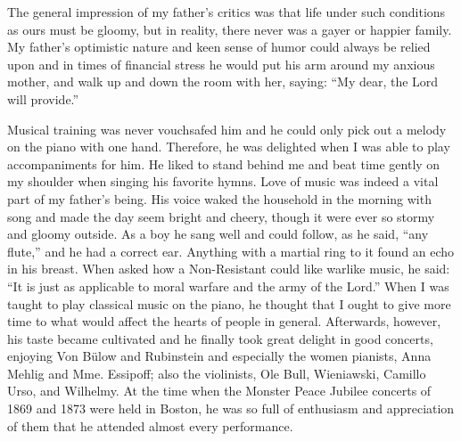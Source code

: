 \documentclass{book}
\begin{document}
The general impression of my father’s critics was that life under such conditions as ours must be gloomy, but in reality, there never was a gayer or happier family. My father’s optimistic nature and keen sense of humor could always be relied upon and in times of financial stress he would put his arm around my anxious mother, and walk up and down the room with her, saying: “My dear, the Lord will provide.”

Musical training was never vouchsafed him and he could only pick out a melody on the piano with one hand. Therefore, he was delighted when I was able to play accompaniments for him. He liked to stand behind me and beat time gently on my shoulder when singing his favorite hymns. Love of music was indeed a vital part of my father’s being. His voice waked the household in the morning with song and made the day seem bright and cheery, though it were ever so stormy and gloomy outside. As a boy he sang well and could follow, as he said, “any flute,” and he had a correct ear. Anything with a martial ring to it found an echo in his breast. When asked how a Non-Resistant could like warlike music, he said: “It is just as applicable to moral warfare and the army of the Lord.” When I was taught to play classical music on the piano, he thought that I ought to give more time to what would affect the hearts of people in general. Afterwards, however, his taste became cultivated and he finally took great delight in good concerts, enjoying Von Bülow and Rubinstein and especially the women pianists, Anna Mehlig and Mme. Essipoff; also the violinists, Ole Bull, Wieniawski, Camillo Urso, and Wilhelmy. At the time when the Monster Peace Jubilee concerts of 1869 and 1873 were held in Boston, he was so full of enthusiasm and appreciation of them that he attended almost every performance.
\end{document}
